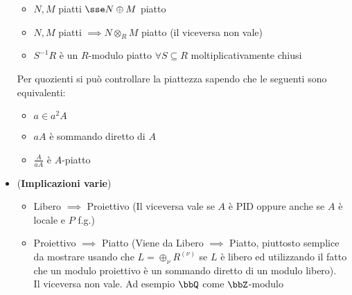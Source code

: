 \documentclass[a4paper,NoNotes,GeneralMath]{stdmdoc}
\begin{document}
\begin{itemize}
\begin{itemize}
				\item $N, M$ piatti $\sse N \oplus M$ piatto
				\item $N, M$ piatti $\implies N \otimes_R M$ piatto (il viceversa non vale)
				\item $S^{-1}R$ è un $R$-modulo piatto $\forall S \subseteq R$ moltiplicativamente chiusi
			\end{itemize}
			Per quozienti si può controllare la piattezza sapendo che le seguenti sono equivalenti:
			\begin{itemize}
				\item $a \in a^2A$
				\item $aA$ è sommando diretto di $A$
				\item $\frac{A}{aA}$ è $A$-piatto
			\end{itemize}
		\item ({\bf Implicazioni varie})
			\begin{itemize}
				\item Libero $\implies$ Proiettivo (Il viceversa vale se $A$ è PID oppure anche se $A$ è locale e $P$ f.g.)
				\item Proiettivo $\implies$ Piatto (Viene da Libero $\implies$ Piatto, piuttosto semplice da mostrare usando che $L = \oplus_\nu R^{(\nu)}$ se $L$ è libero ed utilizzando il fatto che un modulo proiettivo è un sommando diretto di un modulo libero). \\ Il viceversa non vale. Ad esempio $\bbQ$ come $\bbZ$-modulo
			\end{itemize}
	\end{itemize}
	
\end{document}
